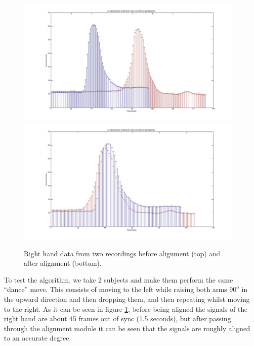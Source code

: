 \documentclass[a4paper]{article}
\begin{document}
\begin{figure}[h]
\centering
\includegraphics[scale=0.2]{Initial_Frame_Det_Before.jpg}
\includegraphics[scale=0.2]{Initial_Frame_Det_After.jpg}
\caption{Right hand data from two recordings before alignment (top) and after alignment (bottom).}
\label{pre_post_alginment}
\end{figure}
\noindent
To test the algorithm, we take 2 subjects and make them perform the same ``dance'' move. This consists of moving to the left while raising both arms $90^o$ in the upward direction and then dropping them, and then repeating whilst moving to the right. 
As it can be seen in figure \ref{pre_post_alginment}, before being aligned the signals of the right hand are about 45 frames out of sync (1.5 seconds), but after passing through the alignment module it can be seen that the signals are roughly aligned to an accurate degree. 

\clearpage
\end{document}
